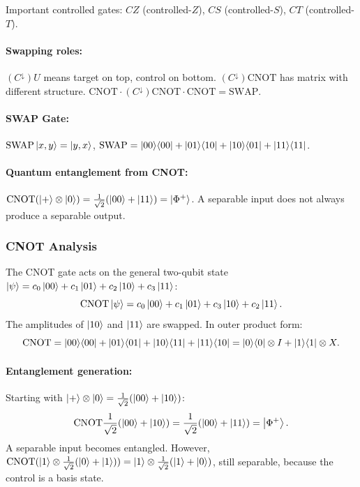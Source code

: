 \documentclass[10pt,a4paper]{article}
\begin{document}
Important controlled gates: $CZ$ (controlled-$Z$), $CS$ (controlled-$S$), $CT$ (controlled-$T$).

\paragraph{Swapping roles:} $(C^\downarrow)U$ means target on top, control on bottom. $(C^\downarrow)\mathrm{CNOT}$ has matrix with different structure. $\mathrm{CNOT}\cdot(C^\downarrow)\mathrm{CNOT}\cdot\mathrm{CNOT}=\mathrm{SWAP}$.

\paragraph{SWAP Gate:} $\mathrm{SWAP}\ket{x,y}=\ket{y,x}$, $\mathrm{SWAP}=\ket{00}\!\bra{00}+\ket{01}\!\bra{10}+\ket{10}\!\bra{01}+\ket{11}\!\bra{11}$.

\paragraph{Quantum entanglement from CNOT:} $\mathrm{CNOT}(\ket{+}\otimes\ket{0})=\frac{1}{\sqrt{2}}(\ket{00}+\ket{11})=\ket{\Phi^+}$. A separable input does not always produce a separable output.

\subsubsection*{CNOT Analysis}

The CNOT gate acts on the general two-qubit state $\ket{\psi}=c_0\ket{00}+c_1\ket{01}+c_2\ket{10}+c_3\ket{11}$:
\[
\mathrm{CNOT}\ket{\psi} = c_0\ket{00}+c_1\ket{01}+c_3\ket{10}+c_2\ket{11}.
\]
The amplitudes of $\ket{10}$ and $\ket{11}$ are swapped. In outer product form:
\[
\mathrm{CNOT} = \ket{00}\!\bra{00}+\ket{01}\!\bra{01}+\ket{10}\!\bra{11}+\ket{11}\!\bra{10} = \ket{0}\!\bra{0}\otimes I + \ket{1}\!\bra{1}\otimes X.
\]

\paragraph{Entanglement generation:} Starting with $\ket{+}\otimes\ket{0}=\frac{1}{\sqrt{2}}(\ket{00}+\ket{10})$:
\[
\mathrm{CNOT}\frac{1}{\sqrt{2}}(\ket{00}+\ket{10}) = \frac{1}{\sqrt{2}}(\ket{00}+\ket{11}) = \ket{\Phi^+}.
\]
A separable input becomes entangled. However, $\mathrm{CNOT}(\ket{1}\otimes\frac{1}{\sqrt{2}}(\ket{0}+\ket{1}))=\ket{1}\otimes\frac{1}{\sqrt{2}}(\ket{1}+\ket{0})$, still separable, because the control is a basis state.
\end{document}
